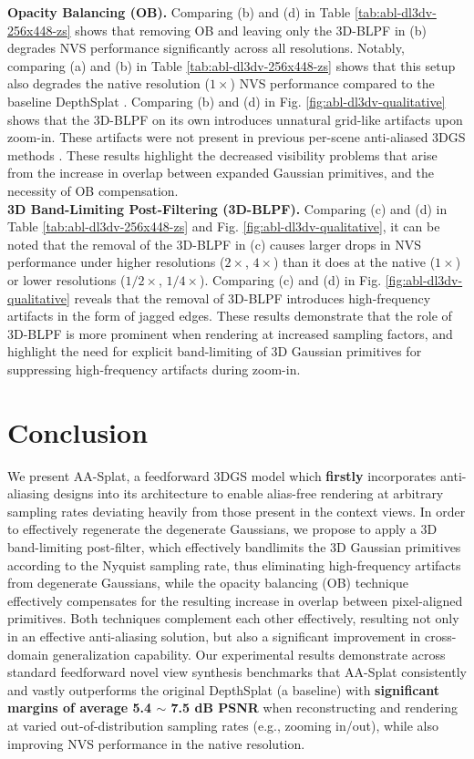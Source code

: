 \documentclass[runningheads]{llncs}
\begin{document}
\noindent \textbf{Opacity Balancing (OB).} Comparing (b) and (d) in Table \ref{tab:abl-dl3dv-256x448-zs} shows that removing OB and leaving only the 3D-BLPF in (b) degrades NVS performance significantly across all resolutions. Notably, comparing (a) and (b) in Table \ref{tab:abl-dl3dv-256x448-zs} shows that this setup also degrades the native resolution ($1\times$) NVS performance compared to the baseline DepthSplat \cite{xu2025depthsplat}. Comparing (b) and (d) in Fig. \ref{fig:abl-dl3dv-qualitative} shows that the 3D-BLPF on its own introduces unnatural grid-like artifacts upon zoom-in. These artifacts were not present in previous per-scene anti-aliased 3DGS methods \cite{yu2024mip, younes2025anti}. These results highlight the decreased visibility problems that arise from the increase in overlap between expanded Gaussian primitives, and the necessity of OB compensation.\\
\noindent \textbf{3D Band-Limiting Post-Filtering (3D-BLPF).} Comparing (c) and (d) in Table \ref{tab:abl-dl3dv-256x448-zs} and Fig. \ref{fig:abl-dl3dv-qualitative}, it can be noted that the removal of the 3D-BLPF in (c) causes larger drops in NVS performance under higher resolutions ($2\times$, $4\times$) than it does at the native ($1\times$) or lower resolutions ($1/2\times$, $1/4\times$). Comparing (c) and (d) in Fig. \ref{fig:abl-dl3dv-qualitative} reveals that the removal of 3D-BLPF introduces high-frequency artifacts in the form of jagged edges. These results demonstrate that the role of 3D-BLPF is more prominent when rendering at increased sampling factors, and highlight the need for explicit band-limiting of 3D Gaussian primitives for suppressing high-frequency artifacts during zoom-in.


\section{Conclusion}
We present AA-Splat, a feedforward 3DGS model which \textbf{firstly} incorporates anti-aliasing designs into its architecture to enable alias-free rendering at arbitrary sampling rates deviating heavily from those present in the context views.
In order to effectively regenerate the degenerate Gaussians, we propose to apply a 3D band-limiting post-filter, which  effectively bandlimits the 3D Gaussian primitives according to the Nyquist sampling rate, thus eliminating high-frequency artifacts from degenerate Gaussians, while the opacity balancing (OB) technique effectively compensates for the resulting increase in overlap between pixel-aligned primitives. Both techniques complement each other effectively, resulting not only in an effective anti-aliasing solution, but also a significant improvement in cross-domain generalization capability.
Our experimental results demonstrate across standard feedforward novel view synthesis benchmarks that AA-Splat consistently and vastly outperforms the original DepthSplat (a baseline) \cite{xu2025depthsplat} with \textbf{significant margins of average 5.4 $\sim$ 7.5 dB PSNR} when reconstructing and rendering at varied out-of-distribution sampling rates (e.g., zooming in/out), while also improving NVS performance in the native resolution.
\end{document}

